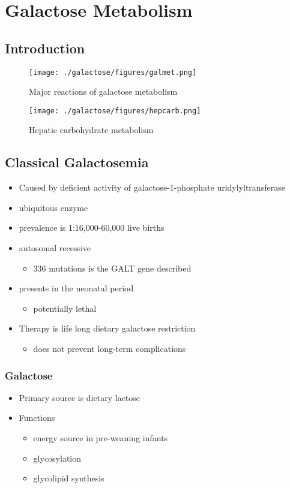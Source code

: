 \documentclass{scrartcl}
\begin{document}
\section{Galactose Metabolism}
\label{sec:org05bac8e}
\subsection{Introduction}
\label{sec:orgaa3bad3}
\begin{figure}[htbp]
\centering
\texttt{[image: ./galactose/figures/galmet.png]}
\caption{\label{fig:orgb7e4a1c}
Major reactions of galactose metabolism}
\end{figure}


\begin{figure}[htbp]
\centering
\texttt{[image: ./galactose/figures/hepcarb.png]}
\caption{\label{fig:orgbba7be7}
Hepatic carbohydrate metabolism}
\end{figure}

\subsection{Classical Galactosemia}
\label{sec:org5b7b9b3}
\begin{itemize}
\item Caused by deficient activity of galactose-1-phosphate uridylyltransferase
\item ubiquitous enzyme
\item prevalence is 1:16,000-60,000 live births
\item autosomal recessive
\begin{itemize}
\item 336 mutations is the GALT gene described
\end{itemize}

\item presents in the neonatal period
\begin{itemize}
\item potentially lethal
\end{itemize}

\item Therapy is life long dietary galactose restriction
\begin{itemize}
\item does not prevent long-term complications
\end{itemize}
\end{itemize}

\subsubsection{Galactose}
\label{sec:org6120ddb}
\begin{itemize}
\item Primary source is dietary lactose
\item Functions
\begin{itemize}
\item energy source in pre-weaning infants
\item glycosylation
\item glycolipid synthesis
\end{itemize}
\end{itemize}
\end{document}
